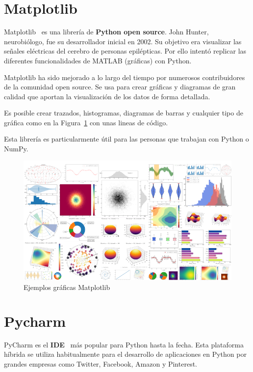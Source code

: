 \documentclass[a4paper, 12pt]{book}
\begin{document}
\section{Matplotlib} 
\label{sec:matplotlib}


Matplotlib~\cite{python:_matplotlib} es una librería de \textbf{Python open source}. John Hunter, neurobiólogo, fue su desarrollador inicial en 2002. Su objetivo era visualizar las señales eléctricas del cerebro de personas epilépticas. Por ello intentó replicar las diferentes funcionalidades de MATLAB (gráficas) con Python. 

Matplotlib ha sido mejorado a lo largo del tiempo por numerosos contribuidores de la comunidad open source. Se usa para crear gráficas y diagramas de gran calidad que aportan la visualización de los datos de  forma detallada.

Es posible crear trazados, histogramas, diagramas de barras y cualquier tipo de gráfica como en la Figura~\ref{fig:matplotlib} con unas lineas de código.

Esta librería es particularmente útil para las personas que trabajan con Python o NumPy.

\begin{figure}[hb]
	\centering
	\includegraphics[width=14cm, keepaspectratio]{img/Matplotlib.png}
	\caption{Ejemplos gráficas Matplotlib}
	\label{fig:matplotlib}
\end{figure}

\section{Pycharm} 
\label{sec:pycharm}

PyCharm es el \textbf{IDE}~\cite{python:_pycharm} más popular para Python hasta la fecha. Esta plataforma híbrida se utiliza habitualmente para el desarrollo de aplicaciones en Python por grandes empresas como Twitter, Facebook, Amazon y Pinterest.
\end{document}
